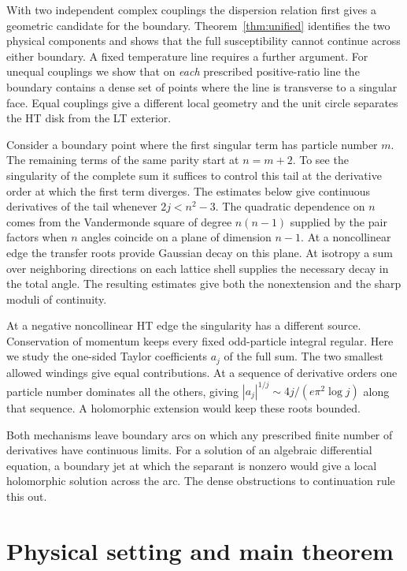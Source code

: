 \documentclass[11pt]{article}
\numberwithin{equation}{section}
\theoremstyle{definition}
\begin{document}
With two independent complex couplings the dispersion relation first
gives a geometric candidate for the boundary. Theorem~\ref{thm:unified}
identifies the two physical components and shows that the full
susceptibility cannot continue across either boundary. A fixed
temperature line requires a further argument. For unequal couplings we
show that on \emph{each} prescribed positive-ratio line the boundary
contains a dense set of points where the line is transverse to a
singular face. Equal couplings give a different local geometry and
the unit circle separates the HT disk from the LT exterior.

Consider a boundary point where the first singular term has particle
number $m$. The remaining terms of the same parity start at $n=m+2$.
To see the singularity of the complete sum it suffices to control this
tail at the derivative order at which the first term diverges.
The estimates below give continuous derivatives of the tail whenever
$2j<n^2-3$. The quadratic dependence on $n$ comes from the
Vandermonde square of degree $n(n-1)$ supplied by the pair factors
when $n$ angles coincide on a plane of dimension $n-1$. At a noncollinear edge the
transfer roots provide Gaussian decay on this plane. At isotropy a
sum over neighboring directions on each lattice shell supplies the
necessary decay in the total angle. The resulting estimates give both
the nonextension and the sharp moduli of continuity.

At a negative noncollinear HT edge the singularity has a different
source. Conservation of momentum keeps every fixed odd-particle integral
regular. Here we
study the one-sided Taylor coefficients $a_j$ of the full sum.
The two smallest allowed windings give equal contributions. At a
sequence of derivative orders one particle number dominates all the
others, giving $|a_{j}|^{1/j}\sim4j/(e\pi^2\log j)$ along that
sequence. A holomorphic extension would keep these roots bounded.

Both mechanisms leave boundary arcs on which any prescribed finite
number of derivatives have continuous limits. For a solution of an
algebraic differential equation, a boundary jet at which the separant
is nonzero would give a local holomorphic solution across the arc.
The dense obstructions to continuation rule this out.

\section{Physical setting and main theorem}
\label{sec:unified}
\end{document}
